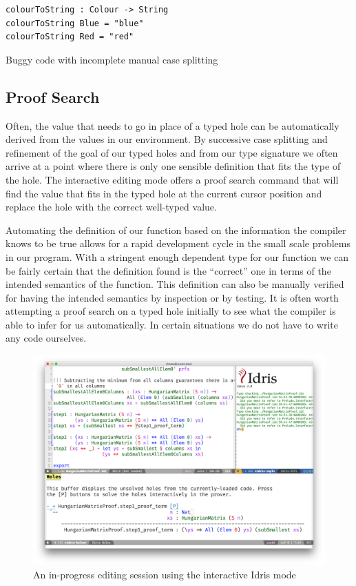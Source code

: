 \documentclass[a4paper, notitlepage]{report}
\begin{document}
\begin{listing}[H]
\begin{verbatim}
colourToString : Colour -> String
colourToString Blue = "blue"
colourToString Red = "red"
\end{verbatim}
\caption{Buggy code with incomplete manual case splitting}
\end{listing}

\subsection{Proof Search}
\label{sec:org25f674f}
Often, the value that needs to go in place of a typed hole can be automatically
derived from the values in our environment. By successive case splitting and
refinement of the goal of our typed holes and from our type signature we often
arrive at a point where there is only one sensible definition that fits the type
of the hole. The interactive editing mode offers a proof search command that
will find the value that fits in the typed hole at the current cursor position
and replace the hole with the correct well-typed value.

Automating the definition of our function based on the information the compiler
knows to be true allows for a rapid development cycle in the small scale
problems in our program. With a stringent enough dependent type for our function
we can be fairly certain that the definition found is the ``correct'' one in
terms of the intended semantics of the function. This definition can also be
manually verified for having the intended semantics by inspection or by testing.
It is often worth attempting a proof search on a typed hole initially to see
what the compiler is able to infer for us automatically. In certain situations
we do not have to write any code ourselves.

\begin{figure}[H]
\centering
\includegraphics[width=0.85\linewidth]{./fig/interactive_idris.png}
\caption{An in-progress editing session using the interactive Idris mode}
\end{figure}
\end{document}
